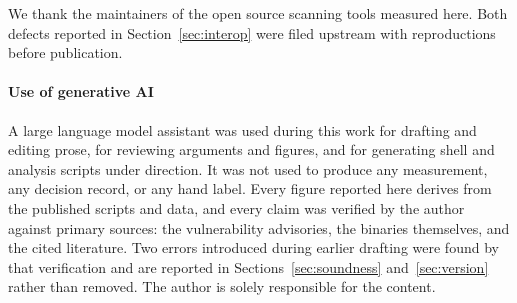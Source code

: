 \documentclass[sigconf,nonacm]{acmart}
\begin{document}
\begin{abstract}
We publish the corpus, the hand labelled ground truth, and all figures as re
derivable artifacts. The binding constraint on binary grounded VEX clearance is
CVE to component identity, not evidence availability, and symbol table absence is
sound evidence only for exported functions.
\end{abstract}


\maketitle

\renewcommand{\thefootnote}{}
\renewcommand{\thefootnote}{\arabic{footnote}}




\begin{acks}
We thank the maintainers of the open source scanning tools measured here. Both
defects reported in Section~\ref{sec:interop} were filed upstream with
reproductions before publication.

\paragraph{Use of generative AI} A large language model assistant was used
during this work for drafting and editing prose, for reviewing arguments and
figures, and for generating shell and analysis scripts under direction. It was
not used to produce any measurement, any decision record, or any hand label.
Every figure reported here derives from the published scripts and data, and
every claim was verified by the author against primary sources: the
vulnerability advisories, the binaries themselves, and the cited literature.
Two errors introduced during earlier drafting were found by that verification
and are reported in Sections~\ref{sec:soundness} and~\ref{sec:version} rather
than removed. The author is solely responsible for the content.
\end{acks}
\end{document}

